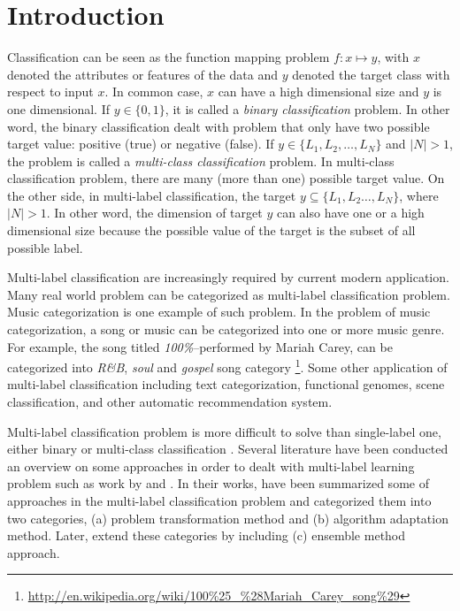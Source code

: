 \documentclass{article}
\begin{document}
\section{Introduction}
\label{intro}


Classification can be seen as the function mapping problem $f\colon x \mapsto y$, with $x$ denoted the attributes or features of the data and $y$ denoted the target class with respect to input $x$. In common case, $x$ can have a high dimensional size and $y$ is one dimensional. If $y \in \{0,1\}$, it is called a \textit{binary classification} problem. In other word, the binary classification dealt with problem that only have two possible target value: positive (true) or negative (false). If $y \in \{L_1,L_2,\dots,L_N\}$ and $|N| > 1$, the problem is called a \textit{multi-class classification} problem. In multi-class classification problem, there are many (more than one) possible target value. On the other side, in multi-label classification, the target $y \subseteq \{L_1,L_2\dots,L_N\}$, where $|N| > 1$. In other word, the dimension of target $y$ can also have one or a high dimensional size because the possible value of the target is the subset of all possible label.

Multi-label classification are increasingly required by current modern application. Many real world problem can be categorized as multi-label classification problem. Music categorization is one example of such problem. In the problem of music categorization, a song or music can be categorized into one or more music genre. For example, the song titled \textit{100\%}--performed by Mariah Carey, can be categorized into \textit{R\&B}, \textit{soul} and \textit{gospel} song category \footnote{\url{http://en.wikipedia.org/wiki/100\%25\_\%28Mariah\_Carey\_song\%29}}. Some other application of multi-label classification including text categorization, functional genomes, scene classification, and other automatic recommendation system.

Multi-label classification problem is more difficult to solve than single-label one, either binary or multi-class classification \cite{Zhang2007}. Several literature have been conducted an overview on some approaches in order to dealt with multi-label learning problem such as work by \cite{Tsoumakas2007} and \cite{Madjarov2012}. In their works, \cite{Tsoumakas2007} have been summarized some of approaches in the multi-label classification problem and categorized them into two categories, (a) problem transformation method and (b) algorithm adaptation method. Later, \cite{Madjarov2012} extend these categories by including (c) ensemble method approach.
\end{document}

